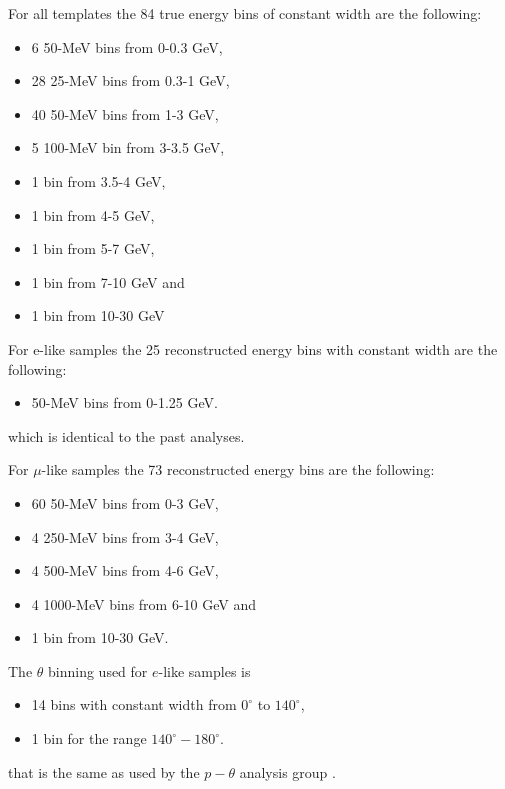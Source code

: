 For all templates the 84 true energy bins of constant width are the following:
\begin{itemize}
 \item   6 50-MeV bins from 0-0.3 GeV, 
 \item 28 25-MeV bins from 0.3-1 GeV,
 \item 40 50-MeV bins from 1-3 GeV,
 \item 5 100-MeV bin from 3-3.5 GeV,
 \item 1 bin from 3.5-4 GeV,
 \item 1 bin from 4-5 GeV,
 \item 1 bin from 5-7 GeV,
 \item 1 bin from 7-10 GeV and 
 \item 1 bin from 10-30 GeV
\end{itemize}


For e-like samples the 25 reconstructed energy bins with constant width are the following:
\begin{itemize}
 \item   50-MeV bins from 0-1.25 GeV.
\end{itemize}
which is identical to the past analyses.

For $\mu$-like samples the 73 reconstructed energy bins are the following:
\begin{itemize}
 \item   60 50-MeV bins from 0-3 GeV, 
 \item   4 250-MeV bins from 3-4 GeV, 
 \item   4 500-MeV bins from 4-6 GeV, 
 \item   4 1000-MeV bins from 6-10 GeV and
 \item   1 bin from 10-30 GeV.
\end{itemize}

The $\theta$ binning used for $e$-like samples is
\begin{itemize}
 \item 14 bins with constant width from $0^{\circ}$ to $140^{\circ}$, 
 \item  1 bin for the range $140^{\circ} - 180^{\circ}$. 
\end{itemize}
that is the same as used by the $p-\theta$ analysis group \cite{ptheta}.

